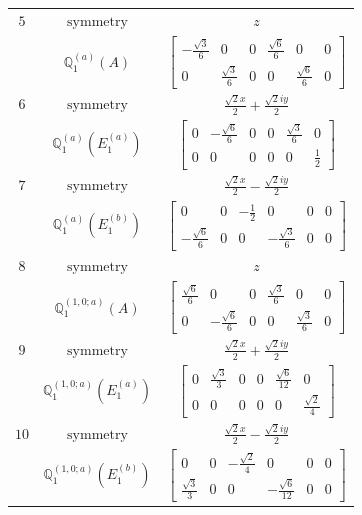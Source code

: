 \documentclass[fleqn,8pt,landscape]{jsarticle}
\begin{document}
\begin{longtable}{ccc}
$ 5 $ & $ \text{symmetry} $ & $ z $ \\
$  $ & $ \mathbb{Q}_{1}^{(a)}(A) $ & $ \begin{bmatrix} - \frac{\sqrt{3}}{6} & 0 & 0 & \frac{\sqrt{6}}{6} & 0 & 0 \\ 0 & \frac{\sqrt{3}}{6} & 0 & 0 & \frac{\sqrt{6}}{6} & 0 \end{bmatrix} $ \\ \hline
$ 6 $ & $ \text{symmetry} $ & $ \frac{\sqrt{2} x}{2} + \frac{\sqrt{2} i y}{2} $ \\
$  $ & $ \mathbb{Q}_{1}^{(a)}(E_{1}^{(a)}) $ & $ \begin{bmatrix} 0 & - \frac{\sqrt{6}}{6} & 0 & 0 & \frac{\sqrt{3}}{6} & 0 \\ 0 & 0 & 0 & 0 & 0 & \frac{1}{2} \end{bmatrix} $ \\ \hline
$ 7 $ & $ \text{symmetry} $ & $ \frac{\sqrt{2} x}{2} - \frac{\sqrt{2} i y}{2} $ \\
$  $ & $ \mathbb{Q}_{1}^{(a)}(E_{1}^{(b)}) $ & $ \begin{bmatrix} 0 & 0 & - \frac{1}{2} & 0 & 0 & 0 \\ - \frac{\sqrt{6}}{6} & 0 & 0 & - \frac{\sqrt{3}}{6} & 0 & 0 \end{bmatrix} $ \\ \hline
$ 8 $ & $ \text{symmetry} $ & $ z $ \\
$  $ & $ \mathbb{Q}_{1}^{(1,0;a)}(A) $ & $ \begin{bmatrix} \frac{\sqrt{6}}{6} & 0 & 0 & \frac{\sqrt{3}}{6} & 0 & 0 \\ 0 & - \frac{\sqrt{6}}{6} & 0 & 0 & \frac{\sqrt{3}}{6} & 0 \end{bmatrix} $ \\ \hline
$ 9 $ & $ \text{symmetry} $ & $ \frac{\sqrt{2} x}{2} + \frac{\sqrt{2} i y}{2} $ \\
$  $ & $ \mathbb{Q}_{1}^{(1,0;a)}(E_{1}^{(a)}) $ & $ \begin{bmatrix} 0 & \frac{\sqrt{3}}{3} & 0 & 0 & \frac{\sqrt{6}}{12} & 0 \\ 0 & 0 & 0 & 0 & 0 & \frac{\sqrt{2}}{4} \end{bmatrix} $ \\ \hline
$ 10 $ & $ \text{symmetry} $ & $ \frac{\sqrt{2} x}{2} - \frac{\sqrt{2} i y}{2} $ \\
$  $ & $ \mathbb{Q}_{1}^{(1,0;a)}(E_{1}^{(b)}) $ & $ \begin{bmatrix} 0 & 0 & - \frac{\sqrt{2}}{4} & 0 & 0 & 0 \\ \frac{\sqrt{3}}{3} & 0 & 0 & - \frac{\sqrt{6}}{12} & 0 & 0 \end{bmatrix} $ \\ \hline

\end{longtable}
\end{document}
